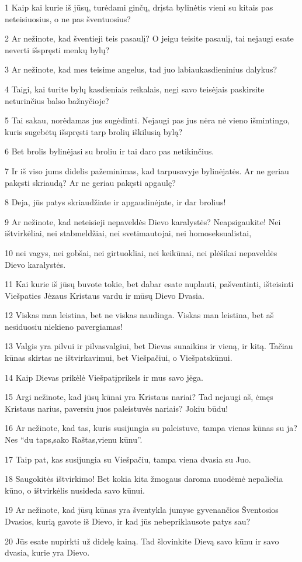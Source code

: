 \par 1 Kaip kai kurie iš jūsų, turėdami ginčų, drįsta bylinėtis vieni su kitais pas neteisiuosius, o ne pas šventuosius? 
\par 2 Ar nežinote, kad šventieji teis pasaulį? O jeigu teisite pasaulį, tai nejaugi esate neverti išspręsti menkų bylų? 
\par 3 Ar nežinote, kad mes teisime angelus, tad juo labiau­kasdieninius dalykus? 
\par 4 Taigi, kai turite bylų kasdieniais reikalais, negi savo teisėjais paskirsite neturinčius balso bažnyčioje? 
\par 5 Tai sakau, norėdamas jus sugėdinti. Nejaugi pas jus nėra nė vieno išmintingo, kuris sugebėtų išspręsti tarp brolių iškilusią bylą? 
\par 6 Bet brolis bylinėjasi su broliu ir tai daro pas netikinčius. 
\par 7 Ir iš viso jums didelis pažeminimas, kad tarpusavyje bylinėjatės. Ar ne geriau pakęsti skriaudą? Ar ne geriau pakęsti apgaulę? 
\par 8 Deja, jūs patys skriaudžiate ir apgaudinėjate, ir dar brolius! 
\par 9 Ar nežinote, kad neteisieji nepaveldės Dievo karalystės? Neapsigaukite! Nei ištvirkėliai, nei stabmeldžiai, nei svetimautojai, nei homoseksualistai, 
\par 10 nei vagys, nei gobšai, nei girtuokliai, nei keikūnai, nei plėšikai nepaveldės Dievo karalystės. 
\par 11 Kai kurie iš jūsų buvote tokie, bet dabar esate nuplauti, pašventinti, išteisinti Viešpaties Jėzaus Kristaus vardu ir mūsų Dievo Dvasia. 
\par 12 Viskas man leistina, bet ne viskas naudinga. Viskas man leistina, bet aš nesiduosiu niekieno pavergiamas! 
\par 13 Valgis yra pilvui ir pilvas­valgiui, bet Dievas sunaikins ir vieną, ir kitą. Tačiau kūnas skirtas ne ištvirkavimui, bet Viešpačiui, o Viešpats­kūnui. 
\par 14 Kaip Dievas prikėlė Viešpatį­prikels ir mus savo jėga. 
\par 15 Argi nežinote, kad jūsų kūnai yra Kristaus nariai? Tad nejaugi aš, ėmęs Kristaus narius, paversiu juos paleistuvės nariais? Jokiu būdu! 
\par 16 Ar nežinote, kad tas, kuris susijungia su paleistuve, tampa vienas kūnas su ja? Nes “du taps,­sako Raštas,­vienu kūnu”. 
\par 17 Taip pat, kas susijungia su Viešpačiu, tampa viena dvasia su Juo. 
\par 18 Saugokitės ištvirkimo! Bet kokia kita žmogaus daroma nuodėmė nepaliečia kūno, o ištvirkėlis nusideda savo kūnui. 
\par 19 Ar nežinote, kad jūsų kūnas yra šventykla jumyse gyvenančios Šventosios Dvasios, kurią gavote iš Dievo, ir kad jūs nebepriklausote patys sau? 
\par 20 Jūs esate nupirkti už didelę kainą. Tad šlovinkite Dievą savo kūnu ir savo dvasia, kurie yra Dievo.


